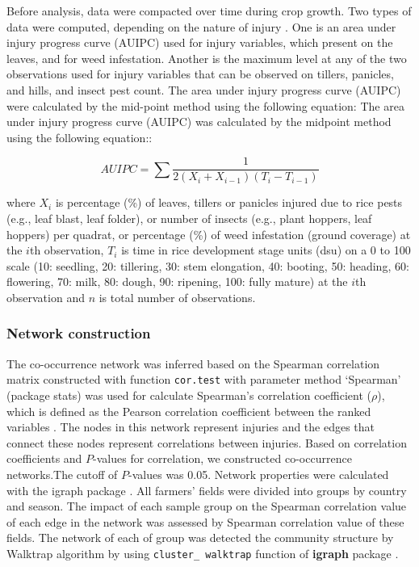 Before analysis, data were compacted over time during crop growth. Two types of data were computed, depending on the nature of injury \citet{Savary_2009_Survey}. One is an area under injury progress curve (AUIPC) used for injury variables, which present on the leaves, and for weed infestation. Another is the maximum level at any of the two observations used for injury variables that can be observed on tillers, panicles, and hills, and insect pest count. The area under injury progress curve (AUIPC) \citep{Campbell_1990_Introduction} were calculated by the mid-point method using the following equation: The area under injury progress curve (AUIPC) was calculated by the midpoint method using the following equation::

\begin{equation}
AUIPC = \sum{\frac{1}{2(X_{i} + X_{i-1})(T_{i} - T_{i-1})}}
\end{equation}

where $X_i$ is percentage (\%) of leaves, tillers or panicles injured due to rice pests (e.g., leaf blast, leaf folder), or number of insects (e.g., plant hoppers, leaf hoppers) per quadrat, or percentage (\%) of weed infestation (ground coverage) at the $i$th observation, $T_i$ is time in rice development stage units (dsu) on a 0 to 100 scale (10: seedling, 20: tillering, 30: stem elongation, 40: booting, 50: heading, 60: flowering, 70: milk, 80: dough, 90: ripening, 100: fully mature) at the $i$th observation and $n$ is total number of observations.

\subsubsection{Network construction}

The co-occurrence network was inferred based on the Spearman correlation matrix constructed with function \texttt{cor.test} with parameter method `Spearman' (package stats) was used for calculate Spearman's correlation coefficient ($\rho$), which is defined as the Pearson correlation coefficient between the ranked variables \cite{R_2015}. The nodes in this network represent injuries and the edges that connect these nodes represent correlations between injuries. Based on correlation coefficients and $P$-values for correlation, we constructed co-occurrence networks.The cutoff of $P$-values was 0.05. Network properties were calculated with the igraph package \citep{Csardi_2010_igraph}. All farmers' fields were divided into groups by country and season. The impact of each sample group on the Spearman correlation value of each edge in the network was assessed by Spearman correlation value of these fields. The network of each of group was detected the community structure by Walktrap algorithm by using \texttt{cluster\_ walktrap} function of \textbf{igraph} package \citep{Pons_2005_Computing}.


